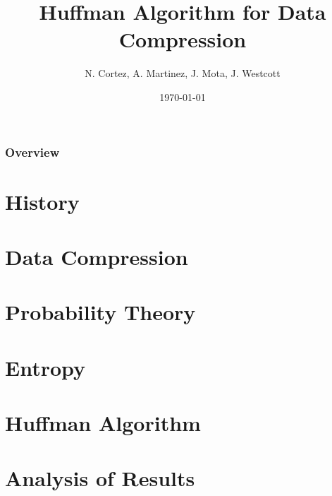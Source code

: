 \documentclass{beamer}
\title[Data Compression]{Huffman Algorithm for Data Compression} %
\author{N. Cortez, A. Martinez, J. Mota, J. Westcott} %
\date{\today} %
\theoremstyle{definition}
\begin{document}
\begin{frame}
\titlepage %
\end{frame}

\begin{frame}

\frametitle{Overview} %
\tableofcontents %
\section{History}
\section{Data Compression}
\section {Probability Theory}
\section {Entropy}
\section{Huffman Algorithm}
\section{Analysis of Results}

\end{frame}
\end{document}
